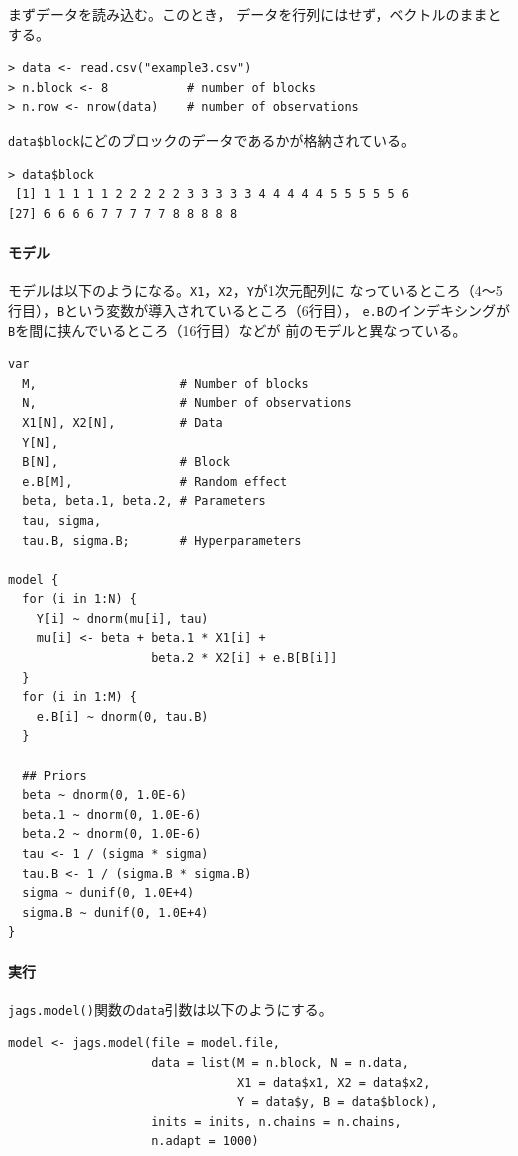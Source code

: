 \documentclass[11pt,uplatex]{jsarticle}
\begin{document}
まずデータを読み込む。このとき，
データを行列にはせず，ベクトルのままとする。
\begin{lstlisting}
> data <- read.csv("example3.csv")
> n.block <- 8           # number of blocks
> n.row <- nrow(data)    # number of observations
\end{lstlisting}

\texttt{data\$block}にどのブロックのデータであるかが格納されている。
\begin{lstlisting}
> data$block
 [1] 1 1 1 1 1 2 2 2 2 2 3 3 3 3 3 4 4 4 4 4 5 5 5 5 5 6
[27] 6 6 6 6 7 7 7 7 7 8 8 8 8 8
\end{lstlisting}

\paragraph{モデル}

モデルは以下のようになる。\texttt{X1}，\texttt{X2}，\texttt{Y}が1次元配列に
なっているところ（4〜5行目），\texttt{B}という変数が導入されているところ（6行目），
\texttt{e.B}のインデキシングが\texttt{B}を間に挟んでいるところ（16行目）などが
前のモデルと異なっている。

\begin{lstlisting}
var
  M,                    # Number of blocks
  N,                    # Number of observations
  X1[N], X2[N],         # Data
  Y[N],
  B[N],                 # Block
  e.B[M],               # Random effect
  beta, beta.1, beta.2, # Parameters
  tau, sigma,
  tau.B, sigma.B;       # Hyperparameters

model {
  for (i in 1:N) {
    Y[i] ~ dnorm(mu[i], tau)
    mu[i] <- beta + beta.1 * X1[i] +
                    beta.2 * X2[i] + e.B[B[i]]
  }
  for (i in 1:M) {
    e.B[i] ~ dnorm(0, tau.B)
  }

  ## Priors
  beta ~ dnorm(0, 1.0E-6)
  beta.1 ~ dnorm(0, 1.0E-6)
  beta.2 ~ dnorm(0, 1.0E-6)
  tau <- 1 / (sigma * sigma)
  tau.B <- 1 / (sigma.B * sigma.B)
  sigma ~ dunif(0, 1.0E+4)
  sigma.B ~ dunif(0, 1.0E+4)
}
\end{lstlisting}

\paragraph{実行}

\texttt{jags.model()}関数の\texttt{data}引数は以下のようにする。
\begin{lstlisting}
model <- jags.model(file = model.file,
                    data = list(M = n.block, N = n.data,
                                X1 = data$x1, X2 = data$x2,
                                Y = data$y, B = data$block),
                    inits = inits, n.chains = n.chains,
                    n.adapt = 1000)
\end{lstlisting}
\end{document}
